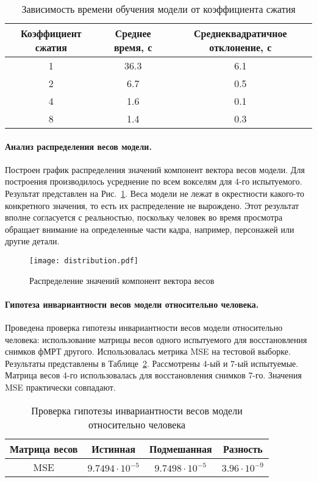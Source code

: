 \documentclass[a4paper, 12pt]{extarticle}
\begin{document}
\begin{table}[h!]
	\centering
	\caption{Зависимость времени обучения модели от коэффициента сжатия}
	\begin{tabular}{|c|c|c|}
		\hline
		Коэффициент сжатия & Среднее время, с & Среднеквадратичное отклонение, с \\ \hline \hline
		1 & 36.3 & 6.1 \\ \hline
		2 & 6.7 & 0.5 \\ \hline
		4 & 1.6 & 0.1 \\ \hline
		8 & 1.4 & 0.3 \\ \hline
	\end{tabular}
	\label{table:coeffs}
\end{table}

\paragraph*{Анализ распределения весов модели.}

Построен график распределения значений компонент вектора весов модели.
Для построения производилось усреднение по всем вокселям для 4-го испытуемого.
Результат представлен на Рис.~\ref{fig:w-distr}.
Веса модели не лежат в окрестности какого-то конкретного значения, 
то есть их распределение не вырождено.
Этот результат вполне согласуется с реальностью, поскольку человек во время просмотра
обращает внимание на определенные части кадра, например, персонажей или
другие детали.

\begin{figure}[h!]
	\centering
	\texttt{[image: distribution.pdf]}
	\caption{Распределение значений компонент вектора весов}
	\label{fig:w-distr}
\end{figure}

\paragraph*{Гипотеза инвариантности весов модели относительно человека.}

Проведена проверка гипотезы инвариантности весов модели относительно человека:
использование матрицы весов одного испытуемого для восстановления снимков фМРТ другого.
Использовалась метрика MSE на тестовой выборке.
Результаты представлены в Таблице~\ref{table:inv}.
Рассмотрены 4-ый и 7-ый испытуемые. Матрица весов 4-го использовалась для восстановления
снимков 7-го.
Значения MSE практически совпадают. 

\begin{table}[h!]
	\centering
	\caption{Проверка гипотезы инвариантности весов модели относительно человека}
	\begin{tabular}{|c|c|c|c|}
		\hline
		Матрица весов & Истинная             & Подмешанная  & Разность        \\ \hline \hline
		MSE           & $9.7494 \cdot 10^{-5}$ & $9.7498 \cdot 10^{-5}$ & $3.96 \cdot 10^{-9}$ \\ \hline
	\end{tabular}
	\label{table:inv}
\end{table}
\end{document}
